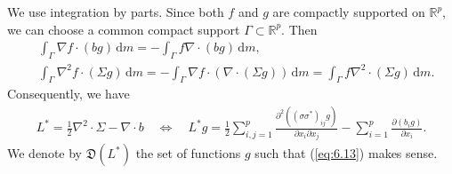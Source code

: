 \documentclass{article}
\numberwithin{equation}{section}
\renewcommand{\d}{\mathrm{d}}
\theoremstyle{plain}
\theoremstyle{definition}
\begin{document}
We use integration by parts. Since both $f$ and $g$ are compactly supported on $\mathbb{R}^p$, we can choose a common compact support $\Gamma\subset\mathbb{R}^p$. Then
\begin{align*}
	&\int_\Gamma \nabla f\cdot (bg)\,\d m = -\int_\Gamma f\nabla\cdot(bg)\,\d m,\\
	&\int_\Gamma\nabla^2 f\cdot(\Sigma g)\,\d m = -\int_\Gamma\nabla f\cdot\left(\nabla\cdot(\Sigma g)\right)\,\d m = \int_\Gamma f\nabla^2\cdot(\Sigma g)\,\d m.
\end{align*}
Consequently, we have
\begin{align*}
	L^*=\frac{1}{2}\nabla^2\cdot\Sigma - \nabla\cdot b\quad\Leftrightarrow\quad L^* g = \frac{1}{2}\sum_{i,j=1}^p\frac{\partial^2((\sigma\sigma^*)_{ij}g)}{\partial x_i\partial x_j} - \sum_{i=1}^p\frac{\partial(b_i g)}{\partial x_i}.\label{eq:6.13}\tag{6.13}
\end{align*}
We denote by $\mathfrak{D}(L^*)$ the set of functions $g$ such that (\ref{eq:6.13}) makes sense.
\end{document}
